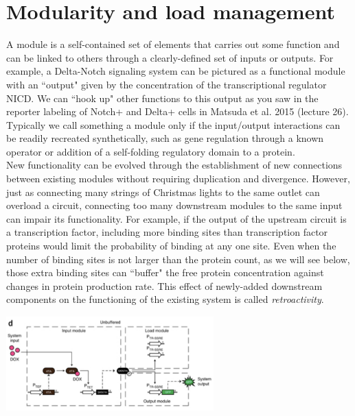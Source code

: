 \documentclass{article}
\begin{document}
\section*{Modularity and load management}

A module is a self-contained set of elements that carries out some function and can be linked to others through a clearly-defined set of inputs or outputs. For example, a Delta-Notch signaling system can be pictured as a functional module with an ``output" given by the concentration of the transcriptional regulator NICD. We can ``hook up" other functions to this output as you saw in the reporter labeling of Notch+ and Delta+ cells in Matsuda et al. 2015 (lecture 26). Typically we call something a module only if the input/output interactions can be readily recreated synthetically, such as gene regulation through a known operator or addition of a self-folding regulatory domain to a protein.\\

New functionality can be evolved through the establishment of new connections between existing modules without requiring duplication and divergence. However, just as connecting many strings of Christmas lights to the same outlet can overload a circuit, connecting too many downstream modules to the same input can impair its functionality. For example, if the output of the upstream circuit is a transcription factor, including more binding sites than transcription factor proteins would limit the probability of binding at any one site. Even when the number of binding sites is not larger than the protein count, as we will see below, those extra binding sites can ``buffer" the free protein concentration against changes in protein production rate. This effect of newly-added downstream components on the functioning of the existing system is called \textit{retroactivity}.

\begin{center}
\includegraphics[width=0.6\textwidth]{unbuffered_diagram.pdf}
\end{center}
\end{document}
